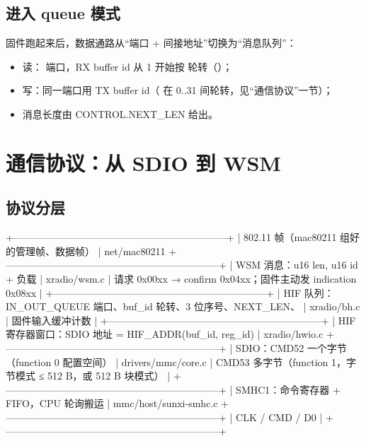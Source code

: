 \subsection{进入 queue 模式}

固件跑起来后，数据通路从``端口 + 间接地址''切换为``消息队列''：

\begin{itemize}
  \item 读： 端口，RX buffer id 从 1 开始按  轮转（）；
  \item 写：同一端口用 TX buffer id（ 在 0..31 间轮转，见“通信协议”一节）；
  \item 消息长度由 CONTROL.NEXT\_LEN 给出。
\end{itemize}

\section{通信协议：从 SDIO 到 WSM}

\subsection{协议分层}

\begin{txtcode}[basicstyle=\ttfamily\scriptsize]
+-----------------------------------------------------------------+
| 802.11 帧（mac80211 组好的管理帧、数据帧）                          |  net/mac80211
+-----------------------------------------------------------------+
| WSM 消息：{u16 len, u16 id} + 负载                                 |  xradio/wsm.c
|   请求 0x00xx → confirm 0x04xx；固件主动发 indication 0x08xx        |
+-----------------------------------------------------------------+
| HIF 队列：IN_OUT_QUEUE 端口、buf_id 轮转、3 位序号、NEXT_LEN、       |  xradio/bh.c
|           固件输入缓冲计数                                          |
+-----------------------------------------------------------------+
| HIF 寄存器窗口：SDIO 地址 = HIF_ADDR(buf_id, reg_id)                |  xradio/hwio.c
+-----------------------------------------------------------------+
| SDIO：CMD52 一个字节（function 0 配置空间）                          |  drivers/mmc/core.c
|       CMD53 多字节（function 1，字节模式 ≤ 512 B，或 512 B 块模式）  |
+-----------------------------------------------------------------+
| SMHC1：命令寄存器 + FIFO，CPU 轮询搬运                               |  mmc/host/sunxi-smhc.c
+-----------------------------------------------------------------+
| CLK / CMD / D0                                                    |
+-----------------------------------------------------------------+
\end{txtcode}


